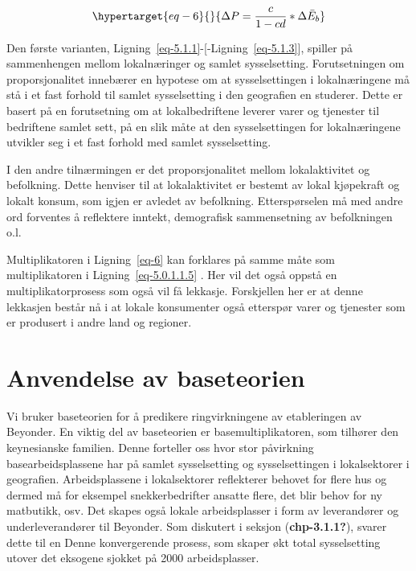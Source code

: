 \documentclass[
]{article}
\begin{document}
\begin{equation}\protect\hypertarget{eq-6}{}{
\Delta{P}=\frac{c}{1-cd}*\Delta\bar{E}_b
}\label{eq-6}\end{equation}

Den første varianten,
Ligning~\ref{eq-5.1.1}-{[}-Ligning~\ref{eq-5.1.3}{]}, spiller på
sammenhengen mellom lokalnæringer og samlet sysselsetting.
Forutsetningen om proporsjonalitet innebærer en hypotese om at
sysselsettingen i lokalnæringene må stå i et fast forhold til samlet
sysselsetting i den geografien en studerer. Dette er basert på en
forutsetning om at lokalbedriftene leverer varer og tjenester til
bedriftene samlet sett, på en slik måte at den sysselsettingen for
lokalnæringene utvikler seg i et fast forhold med samlet sysselsetting.

I den andre tilnærmingen er det proporsjonalitet mellom lokalaktivitet
og befolkning. Dette henviser til at lokalaktivitet er bestemt av lokal
kjøpekraft og lokalt konsum, som igjen er avledet av befolkning.
Etterspørselen må med andre ord forventes å reflektere inntekt,
demografisk sammensetning av befolkningen o.l.

Multiplikatoren i Ligning~\ref{eq-6} kan forklares på samme måte som
multiplikatoren i Ligning~\ref{eq-5.0.1.1.5} . Her vil det også oppstå
en multiplikatorprosess som også vil få lekkasje. Forskjellen her er at
denne lekkasjen består nå i at lokale konsumenter også etterspør varer
og tjenester som er produsert i andre land og regioner.

\hypertarget{anvendelse-av-baseteorien}{%
\section{Anvendelse av baseteorien}\label{anvendelse-av-baseteorien}}

Vi bruker baseteorien for å predikere ringvirkningene av etableringen av
Beyonder. En viktig del av baseteorien er basemultiplikatoren, som
tilhører den keynesianske familien. Denne forteller oss hvor stor
påvirkning basearbeidsplassene har på samlet sysselsetting og
sysselsettingen i lokalsektorer i geografien. Arbeidsplassene i
lokalsektorer reflekterer behovet for flere hus og dermed må for
eksempel snekkerbedrifter ansatte flere, det blir behov for ny
matbutikk, osv. Det skapes også lokale arbeidsplasser i form av
leverandører og underleverandører til Beyonder. Som diskutert i seksjon
(\textbf{chp-3.1.1?}), svarer dette til en Denne konvergerende prosess,
som skaper økt total sysselsetting utover det eksogene sjokket på 2000
arbeidsplasser.
\end{document}
